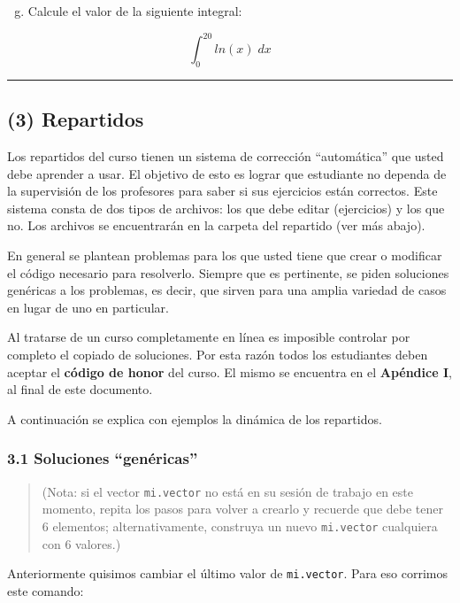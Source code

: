 \documentclass[]{article}
\begin{document}
\begin{enumerate}[a.]
\setcounter{enumi}{6}
\item
  Calcule el valor de la siguiente integral:
\end{enumerate}
\[
  \int_{0} ^{20} ln(x) \; dx
\]

\begin{center}\rule{3in}{0.4pt}\end{center}

\subsection{(3) Repartidos}

Los repartidos del curso tienen un sistema de corrección ``automática''
que usted debe aprender a usar. El objetivo de esto es lograr que
estudiante no dependa de la supervisión de los profesores para saber si
sus ejercicios están correctos. Este sistema consta de dos tipos de
archivos: los que debe editar (ejercicios) y los que no. Los archivos se
encuentrarán en la carpeta del repartido (ver más abajo).

En general se plantean problemas para los que usted tiene que crear o
modificar el código necesario para resolverlo. Siempre que es
pertinente, se piden soluciones genéricas a los problemas, es decir, que
sirven para una amplia variedad de casos en lugar de uno en particular.

Al tratarse de un curso completamente en línea es imposible controlar
por completo el copiado de soluciones. Por esta razón todos los
estudiantes deben aceptar el \textbf{código de honor} del curso. El
mismo se encuentra en el \textbf{Apéndice I}, al final de este
documento.

A continuación se explica con ejemplos la dinámica de los repartidos.

\subsubsection{3.1 Soluciones ``genéricas''}

\begin{quote}
(Nota: si el vector \texttt{mi.vector} no está en su sesión de trabajo
en este momento, repita los pasos para volver a crearlo y recuerde que
debe tener 6 elementos; alternativamente, construya un nuevo
\texttt{mi.vector} cualquiera con 6 valores.)

\end{quote}
Anteriormente quisimos cambiar el último valor de \texttt{mi.vector}.
Para eso corrimos este comando:
\end{document}
